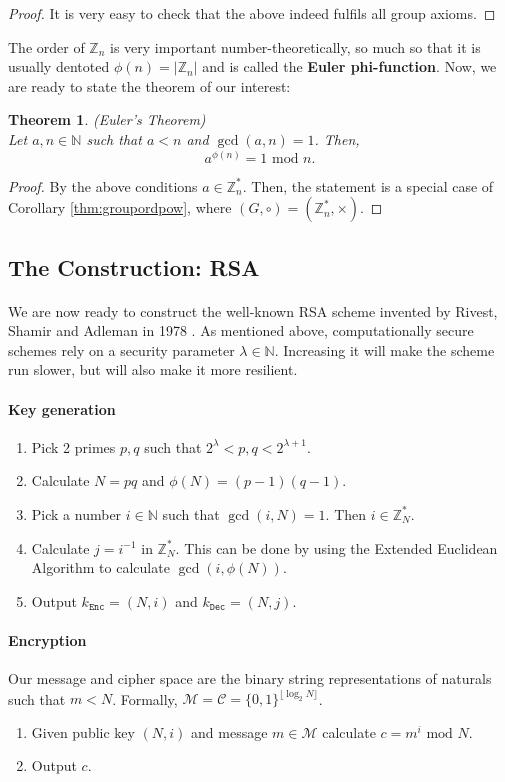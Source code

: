 \documentclass{article}
\newtheorem{theorem}{Theorem}[section]
\theoremstyle{definition}
\newcommand{\Enc}{\texttt{Enc}}
\newcommand{\Dec}{\texttt{Dec}}
\newcommand{\M}{\mathcal{M}}
\renewcommand{\C}{\mathcal{C}}
\newcommand{\Int}{\mathbb{Z}}
\newcommand{\Nat}{\mathbb{N}}
\renewcommand{\mod}{\,\,\text{mod}\,\,}
\begin{document}
\begin{proof}
  It is very easy to check that the above indeed fulfils all group axioms.
\end{proof}
The order of $\Int_n$ is very important number-theoretically, so much so that it
is usually dentoted $\phi(n) = |\Int_n|$ and is called the \textbf{Euler phi-function}.
Now, we are ready to state the theorem of our interest:
\begin{theorem}{(Euler's Theorem)}\\
  \label{thm:eulersthm}
  Let $a, n \in \Nat$ such that $a < n$ and $\gcd(a, n) = 1$. Then,
  \[
    a^{\phi(n)} = 1 \mod n.
  \]
\end{theorem}
\begin{proof}
  By the above conditions $a \in \Int^*_n$. Then, the statement is a special
  case of Corollary \ref{thm:groupordpow}, where $(G, \circ) = (\Int^*_n, \times)$.
\end{proof}
\subsection{The Construction: RSA}
\paragraph{}
We are now ready to construct the well-known RSA scheme invented by Rivest,
Shamir and Adleman in 1978 \cite{rivest1978method}. As mentioned above, computationally secure schemes rely on
a security parameter $\lambda \in \Nat$. Increasing it will make the scheme run
slower, but will also make it more resilient.
\paragraph{Key generation}
\begin{enumerate}
\item Pick 2 primes $p, q$ such that $2^\lambda < p, q <
2^{\lambda + 1}$.
\item Calculate $N = pq$ and $\phi(N) = (p - 1)(q - 1)$.
\item Pick a number $i \in \Nat$ such that $\gcd(i, N) = 1$. Then $i \in
  \Int^*_N$.
\item Calculate $j = i^{-1}$ in $\Int^*_N$. This can be done by using the
  Extended Euclidean Algorithm to calculate $\gcd(i, \phi(N))$.
\item Output $k_\Enc = (N, i)$ and $k_\Dec = (N, j)$.
\end{enumerate}
\paragraph{Encryption}
Our message and cipher space are the binary string representations of naturals such that $m
< N$. Formally, $\M = \C = \{0, 1\}^{\lfloor {\log_2N} \rfloor}$.
\begin{enumerate}
\item Given public key $(N, i)$ and message $m \in \M$ calculate $c = m^i \mod N$.
\item Output $c$.
\end{enumerate}
\end{document}
